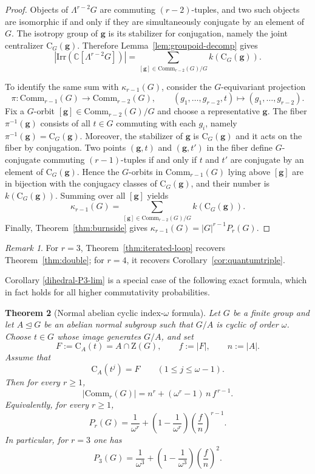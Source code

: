 \documentclass[11pt]{article}
\newtheorem{theorem}{Theorem}[section]
\theoremstyle{definition}
\theoremstyle{remark}
\newtheorem{remark}[theorem]{Remark}
\theoremstyle{definition}
\theoremstyle{plain}
\newcommand{\Irr}{\mathrm{Irr}}
\newcommand{\Z}{\mathrm{Z}}
\newcommand{\C}{\mathrm{C}}
\newcommand{\Comm}{\mathrm{Comm}}
\begin{document}
\begin{proof}
Objects of $\Lambda^{r-2}G$ are commuting $(r{-}2)$-tuples, and two such objects are isomorphic if and only if they are simultaneously conjugate by an element of $G$.
The isotropy group of $\mathbf g$ is its stabilizer for conjugation, namely the joint centralizer $\C_G(\mathbf g)$.
Therefore Lemma~\ref{lem:groupoid-decomp} gives
\[
|\Irr(\mathbb C[\Lambda^{r-2}G])|
=\sum_{[\mathbf g]\in \Comm_{r-2}(G)/G} k(\C_G(\mathbf g)).
\]

To identify the same sum with $\kappa_{r-1}(G)$, consider the $G$-equivariant projection
\[
\pi:\Comm_{r-1}(G)\to \Comm_{r-2}(G),\qquad (g_1,\dots,g_{r-2},t)\mapsto (g_1,\dots,g_{r-2}).
\]
Fix a $G$-orbit $[\mathbf g]\in \Comm_{r-2}(G)/G$ and choose a representative $\mathbf g$.
The fiber $\pi^{-1}(\mathbf g)$ consists of all $t\in G$ commuting with each $g_i$, namely $\pi^{-1}(\mathbf g)=\C_G(\mathbf g)$.
Moreover, the stabilizer of $\mathbf g$ is $\C_G(\mathbf g)$ and it acts on the fiber by conjugation.
Two points $(\mathbf g,t)$ and $(\mathbf g,t')$ in the fiber define $G$-conjugate commuting $(r{-}1)$-tuples if and only if $t$ and $t'$ are conjugate by an element of $\C_G(\mathbf g)$.
Hence the $G$-orbits in $\Comm_{r-1}(G)$ lying above $[\mathbf g]$ are in bijection with the conjugacy classes of $\C_G(\mathbf g)$, and their number is $k(\C_G(\mathbf g))$.
Summing over all $[\mathbf g]$ yields
\[
\kappa_{r-1}(G)=\sum_{[\mathbf g]\in \Comm_{r-2}(G)/G} k(\C_G(\mathbf g)).
\]
Finally, Theorem~\ref{thm:burnside} gives $\kappa_{r-1}(G)=|G|^{r-1}P_r(G)$.
\end{proof}

\begin{remark}
For $r=3$, Theorem~\ref{thm:iterated-loop} recovers Theorem~\ref{thm:double}; for $r=4$, it recovers Corollary~\ref{cor:quantumtriple}.
\end{remark}

Corollary \ref{dihedral-P3-lim} is a special case of the following exact formula, which in fact holds for all higher commutativity probabilities.

\begin{theorem}[Normal abelian cyclic index-$\omega$ formula]\label{prop:Pk-normal-index-p}
Let $G$ be a finite group and let $A\trianglelefteq G$ be an abelian normal subgroup such that $G/A$ is cyclic of order $\omega$.
Choose $t\in G$ whose image generates $G/A$, and set
\[
F:=\C_A(t)=A\cap \Z(G),\qquad f:=|F|,\qquad n:=|A|.
\]
Assume that
\[
\C_A(t^j)=F\qquad (1\le j\le \omega-1).
\]
Then for every $r\ge 1$,
\begin{equation}\label{eq:Comm-k-index-p}
|\Comm_r(G)|=n^r+(\omega^r-1)\,n\,f^{\,r-1}.
\end{equation}
Equivalently, for every $r\ge 1$,
\begin{equation}\label{eq:Pk-index-p}
P_r(G)
=\frac{1}{\omega^r}+\left(1-\frac{1}{\omega^r}\right)\left(\frac{f}{n}\right)^{r-1}.
\end{equation}
In particular, for $r=3$ one has
\[
P_3(G)=\frac{1}{\omega^3}+\left(1-\frac{1}{\omega^3}\right)\left(\frac{f}{n}\right)^2 .
\]
\end{theorem}
\end{document}
